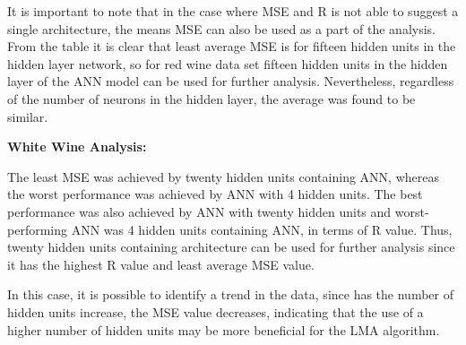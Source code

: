 It is important to note that in the case where MSE and R is not able to suggest a single architecture, the means MSE can also be used as a part of the analysis. From the table it is clear that least average MSE is for fifteen hidden units in the hidden layer network, so for red wine data set fifteen hidden units in the hidden layer of the ANN model can be used for further analysis. Nevertheless, regardless of the number of neurons in the hidden layer, the average was found to be similar.

\begin{table}[htbp]
    \centering
    \caption{Summary of tests performed with LMA for red wine test data set}
    \label{tab:LMAredwine}
\end{table}

\textbf{White Wine Analysis:}

The least MSE was achieved by twenty hidden units containing ANN, whereas the worst performance was achieved by ANN with 4 hidden units. The best performance was also achieved by ANN with twenty hidden units and worst-performing ANN was 4 hidden units containing ANN, in terms of R value. Thus, twenty hidden units containing architecture can be used for further analysis since it has the highest R value and least average MSE value.

In this case, it is possible to identify a trend in the data, since has the number of hidden units increase, the MSE value decreases, indicating that the use of a higher number of hidden units may be more beneficial for the LMA algorithm. 

